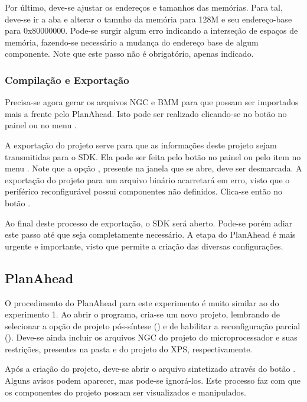 \documentclass[11pt,a4paper,oneside]{book}
\begin{document}
Por último, deve-se ajustar os endereços e tamanhos das memórias.
Para tal, deve-se ir a aba  e alterar o tamnho da memória  para 128M e seu endereço-base para 0x80000000.
Pode-se surgir algum erro indicando a interseção de espaços de memória, fazendo-se necessário a mudança do endereço base de algum componente.
Note que este passo não é obrigatório, apenas indicado.

\subsubsection{Compilação e Exportação}
Precisa-se agora gerar os arquivos NGC e BMM para que possam ser importados mais a frente pelo PlanAhead.
Isto pode ser realizado clicando-se no botão  no painel  ou no menu .

A exportação do projeto serve para que as informações deste projeto sejam transmitidas para o SDK.
Ela pode ser feita pelo botão  no painel  ou pelo item  no menu .
Note que a opção , presente na janela que se abre, deve ser desmarcada.
A exportação do projeto para um arquivo binário acarretará em erro, visto que o periférico reconfigurável possui componentes não definidos.
Clica-se então no botão .

Ao final deste processo de exportação, o SDK será aberto.
Pode-se porém adiar este passo até que seja completamente necessário.
A etapa do PlanAhead é mais urgente e importante, visto que permite a criação das diversas configurações.

\subsection{PlanAhead}
O procedimento do PlanAhead para este experimento é muito similar ao do experimento 1.
Ao abrir o programa, cria-se um novo projeto, lembrando de selecionar a opção de projeto pós-síntese () e de habilitar a reconfiguração parcial ().
Deve-se ainda incluir os arquivos NGC do projeto do microprocessador e suas restrições, presentes na pasta  e  do projeto do XPS, respectivamente.

Após a criação do projeto, deve-se abrir o arquivo sintetizado através do botão .
Alguns avisos podem aparecer, mas pode-se ignorá-los.
Este processo faz com que os componentes do projeto possam ser visualizados e manipulados.
\end{document}
